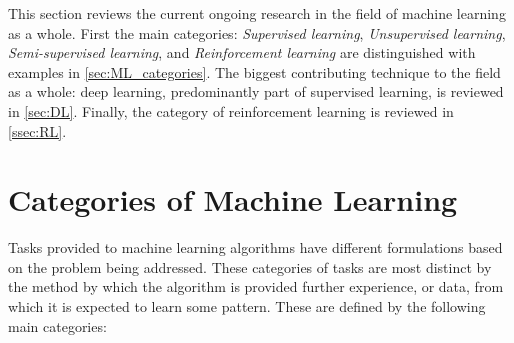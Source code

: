 
This section reviews the current ongoing research in the field of machine
learning as a whole. First the main categories: \textit{Supervised learning},
\textit{Unsupervised learning}, \textit{Semi-supervised learning}, and
\textit{Reinforcement learning} are distinguished with examples in
\autoref{sec:ML_categories}. The biggest contributing technique to the field as
a whole: deep learning, predominantly part of supervised learning, is reviewed
in \autoref{sec:DL}. Finally, the category of reinforcement learning is reviewed
in \autoref{ssec:RL}.




\section{Categories of Machine Learning\label{sec:ML_categories}}

Tasks provided to machine learning algorithms have different formulations based
on the problem being addressed. These categories of tasks are most distinct by
the method by which the algorithm is provided further experience, or data, from
which it is expected to learn some pattern. These are defined by the following
main categories:

